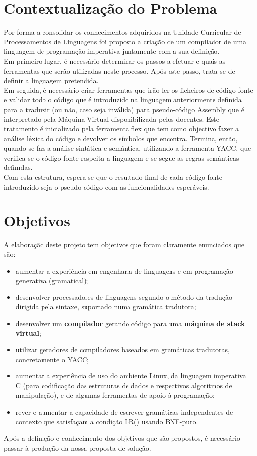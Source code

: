 \documentclass{report}
\begin{document}
\section{Contextualização do Problema} \label{ctp}
Por forma a consolidar os conhecimentos adquiridos na Unidade Curricular de Processamentos de Linguagens foi proposto a criação de um compilador de uma linguagem de programação imperativa juntamente com a sua definição. \\ Em primeiro lugar, é necessário determinar os passos a efetuar e quais as ferramentas que serão utilizadas neste processo. Após este passo, trata-se de definir a linguagem pretendida. \\ Em seguida, é necessário criar ferramentas que irão ler os ficheiros de código fonte e validar todo o código que é introduzido na linguagem anteriormente definida para a traduzir (ou não, caso seja inválida) para pseudo-código Assembly que é interpretado pela Máquina Virtual disponibilizada pelos docentes. Este tratamento é inicializado pela ferramenta flex que tem como objectivo fazer a análise léxica do código e devolver os símbolos que encontra. Termina, então, quando se faz a análise sintática e semântica, utilizando a ferramenta YACC, que verifica se o código fonte respeita a linguagem e se segue as regras semânticas definidas. \\ Com esta estrutura, espera-se que o resultado final de cada código fonte introduzido seja o pseudo-código com as funcionalidades esperáveis.

\section{Objetivos}
A elaboração deste projeto tem objetivos que foram claramente enunciados que são: 
\begin{itemize}
	\item aumentar a experiência em engenharia de linguagens e em programação generativa (gramatical);
	\item desenvolver processadores de linguagens segundo o método da tradução dirigida pela sintaxe, suportado numa gramática tradutora;
	\item desenvolver um \textbf{compilador} gerando código para uma \textbf{máquina de stack virtual};
	\item utilizar geradores de compiladores baseados em gramáticas tradutoras, concretamente o YACC;
	\item aumentar a experiência de uso do ambiente Linux, da linguagem imperativa C (para codificação das estruturas
	de dados e respectivos algoritmos de manipulação), e de algumas ferramentas de apoio à programação;
	\item rever e aumentar a capacidade de escrever gramáticas independentes de contexto que satisfaçam a condição LR()
	usando BNF-puro.
\end{itemize}
Após a definição e conhecimento dos objetivos que são propostos, é necessário passar à produção da nossa proposta de solução.
\end{document}

